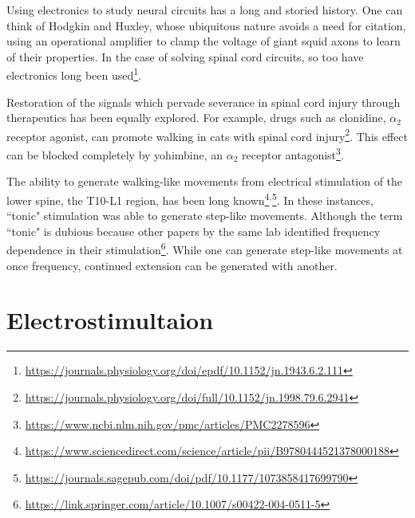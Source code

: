 \documentclass[12pt]{report}
\begin{document}
Using electronics to study neural circuits has a long and storied history. One can think of Hodgkin and Huxley, whose ubiquitous nature avoids a need for citation, using an operational amplifier to clamp the voltage of giant squid axons to learn of their properties. In the case of solving spinal cord circuits, so too have electronics long been used\footnote{\url{https://journals.physiology.org/doi/epdf/10.1152/jn.1943.6.2.111}}.\newline

Restoration of the signals which pervade severance in spinal cord injury through therapeutics has been equally explored. For example, drugs such as clonidine, $\alpha_2$ receptor agonist, can promote walking in cats with spinal cord injury\footnote{\url{https://journals.physiology.org/doi/full/10.1152/jn.1998.79.6.2941}}. This effect can be blocked completely by yohimbine, an $\alpha_2$ receptor antagonist\footnote{\url{https://www.ncbi.nlm.nih.gov/pmc/articles/PMC2278596}}.\newline

The ability to generate walking-like movements from electrical stimulation of the lower spine, the T10-L1 region, has been long known\footnote{\url{https://www.sciencedirect.com/science/article/pii/B9780444521378000188}}$^,$\footnote{\url{https://journals.sagepub.com/doi/pdf/10.1177/1073858417699790}}. In these instances, ``tonic" stimulation was able to generate step-like movements. Although the term ``tonic" is dubious because other papers by the same lab identified frequency dependence in their stimulation\footnote{\url{https://link.springer.com/article/10.1007/s00422-004-0511-5}}. While one can generate step-like movements at once frequency, continued extension can be generated with another. 

\section{Electrostimultaion}
\end{document}
